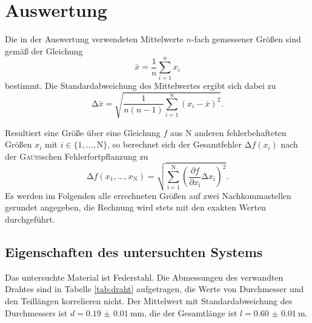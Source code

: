 \section{Auswertung}
\label{sec:Auswertung}
Die in der Auswertung verwendeten Mittelwerte $n$-fach gemessener Größen sind gemäß der Gleichung
\begin{equation}
    \bar{x}=\frac{1}{n}\sum_{i=1}^n x_i
    \label{eq:mittelwert}
\end{equation}
bestimmt. 
Die Standardabweichung des Mittelwertes ergibt sich dabei zu
\begin{equation}
    \mathup{\Delta}\bar{x}=\sqrt{\frac{1}{n(n-1)}\sum_{i=1}^n\left(x_i-\bar{x}\right)^2}.
    \label{eq:standardabweichung}
\end{equation}

Resultiert eine Größe über eine Gleichung $f$ aus N anderen fehlerbehafteten Größen $x_i$ mit $i\in\{1,…,\text{N}\}$, so
berechnet sich der Gesamtfehler $\mathup{\Delta}f(x_i)$ nach der \textsc{Gauß}schen Fehlerfortpflanzung zu
\begin{equation}
	\mathup{\Delta}f(x_1,...,x_\text{N})=\sqrt{\sum_{\text{i}=1}^\text{N}\left(\frac{\partial f}{\partial x_\text{i}}\mathup{\Delta}x_\text{i}\right)^2}.
	\label{eq:gauss_gen}
\end{equation}
Es werden im Folgenden alle errechneten Größen auf zwei Nachkommastellen gerundet angegeben, 
die Rechnung wird stets mit den exakten Werten durchgeführt.
\subsection{Eigenschaften des untersuchten Systems}
\label{sec:auswertung1}
Das untersuchte Material ist Federstahl.
Die Abmessungen des verwandten Drahtes sind in Tabelle \ref{tab:draht} aufgetragen, die Werte von Durchmesser und den Teillängen korrelieren nicht.
Der Mittelwert mit Standardabweichung des Durchmessers ist $d=\SI{0.19(1)}{\milli\meter}$, die der Gesamtlänge ist $l=\SI{0.60(1)}{\meter}$.

